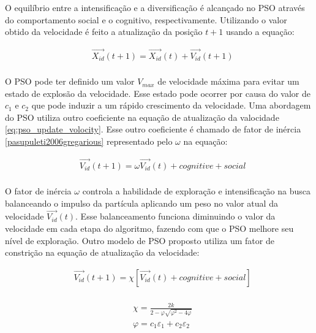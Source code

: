 O equilíbrio entre a intensificação e a diversificação é alcançado no PSO através do comportamento social e o cognitivo, respectivamente. Utilizando o valor obtido da velocidade é feito a atualização da posição $t + 1$ usando a equação:

\begin{equation}
\label{eq:pso_update_position}
\begin{split}
& \vec{X_{id}}(t + 1) = \vec{X_{id}}(t) + \vec{V_{id}}(t + 1) \\
\end{split}
\end{equation}

O PSO pode ter definido um valor $V_{max}$ de velocidade máxima para evitar um estado de explosão da velocidade. Esse estado pode ocorrer por causa do valor de $c_1$ e $c_2$ que pode induzir a um rápido crescimento da velocidade. Uma abordagem do PSO utiliza outro coeficiente na equação de atualização da valocidade \ref{eq:pso_update_volocity}. Esse outro coeficiente é chamado de fator de inércia \ref{pasupuleti2006gregarious} representado pelo $\omega$ na equação:

\begin{equation}
\label{eq:pso_update_volocity_inertia}
\begin{split}
& \vec{V_{id}}(t + 1) = \omega \vec{V_{id}}(t) + cognitive + social \\
\end{split}
\end{equation}

O fator de inércia $\omega$ controla a habilidade de exploração e intensificação na busca balanceando o impulso da partícula aplicando um peso no valor atual da velocidade $\vec{V_{id}}(t)$. Esse balanceamento funciona diminuindo o valor da velocidade em cada etapa do algoritmo, fazendo com que o PSO melhore seu nível de exploração. Outro modelo de PSO proposto utiliza um fator de constrição na equação de atualização da velocidade:

\begin{equation}
\label{eq:pso_update_volocity_constriction}
\begin{split}
& \vec{V_{id}}(t + 1) = \chi [\vec{V_{id}}(t) + cognitive + social] \\
\end{split}
\end{equation}

\begin{equation}
\label{eq:pso_constriction_values}
\begin{split}
& \chi = \frac{2 k}{2 - \varphi \sqrt{\varphi^{2} -4 \varphi}} \\
& \varphi = c_1 \varepsilon_1 + c_2 \varepsilon_2 \\
\end{split}
\end{equation}

